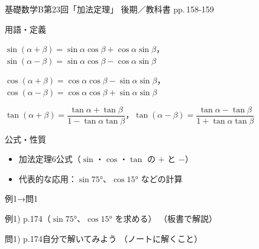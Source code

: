 \documentclass[aspectratio=43,professionalfonts,handout]{beamer}
\newcommand{\LectureNum}{23}
\newcommand{\LectureTitle}{加法定理}
\newcommand{\TextPages}{pp.\,158-159}
\newcommand{\CourseName}{基礎数学B}
\renewcommand{\TermName}{後期}
\begin{document}
\begin{frame}{\CourseName\quad 第\LectureNum 回「\LectureTitle 」}
  {\small \TermName\quad \TeacherName\quad ／\quad 教科書 \TextPages}

  \begin{block}{用語・定義}
  \begin{description}[labelwidth=5.5em]
    \item[\kw{$\sin(\alpha \pm \beta) = \sin\alpha\cos\beta \pm \cos\alpha\sin\beta$}]
      $\sin(\alpha+\beta) = \sin\alpha\cos\beta + \cos\alpha\sin\beta$，$\sin(\alpha-\beta) = \sin\alpha\cos\beta - \cos\alpha\sin\beta$
    \item[\kw{$\cos(\alpha \pm \beta) = \cos\alpha\cos\beta \mp \sin\alpha\sin\beta$}]
      $\cos(\alpha+\beta) = \cos\alpha\cos\beta - \sin\alpha\sin\beta$，$\cos(\alpha-\beta) = \cos\alpha\cos\beta + \sin\alpha\sin\beta$
    \item[\kw{$\tan(\alpha \pm \beta) = (\tan\alpha \pm \tan\beta)/(1 \mp \tan\alpha\tan\beta)$}]
      $\tan(\alpha+\beta) = \dfrac{\tan\alpha+\tan\beta}{1-\tan\alpha\tan\beta}$，$\tan(\alpha-\beta) = \dfrac{\tan\alpha-\tan\beta}{1+\tan\alpha\tan\beta}$
  \end{description}
  \end{block}
\end{frame}

\begin{frame}{公式・性質}
  \begin{block}{}
  \begin{itemize}
    \item 加法定理6公式（$\sin$・$\cos$・$\tan$ の $+$ と $-$）
    \item 代表的な応用：$\sin 75°$、$\cos 15°$ などの計算
  \end{itemize}
  \end{block}
\end{frame}

\begin{frame}{例1→問1}
  \begin{exampleblock}{例1) p.174（$\sin 75°$、$\cos 15°$ を求める）}
    （板書で解説）
  \end{exampleblock}

  \vfill

  \begin{block}{問1) p.174\quad 自分で解いてみよう}
    （ノートに解くこと）
  \end{block}
\end{frame}
\end{document}
